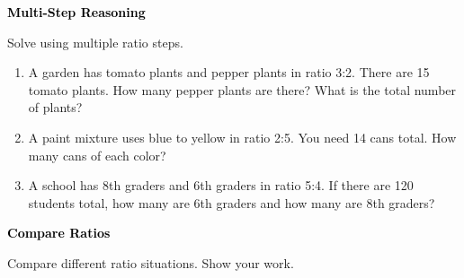 \documentclass[12pt, letterpaper, fleqn]{article}
\begin{document}
\newpage

\begin{tcolorbox}[colback=customteal!20]
\large\textcolor{black}{\textbf{Multi-Step Reasoning}}
\end{tcolorbox}

\noindent
Solve using multiple ratio steps.

\vspace{3mm}

\begin{enumerate}[itemsep=2.2cm, leftmargin=0.6cm]

\item A garden has tomato plants and pepper plants in ratio 3:2. There are 15 tomato plants. How many pepper plants are there? What is the total number of plants?

\vspace{2cm}

\item A paint mixture uses blue to yellow in ratio 2:5. You need 14 cans total. How many cans of each color?

\vspace{2cm}

\item A school has 8th graders and 6th graders in ratio 5:4. If there are 120 students total, how many are 6th graders and how many are 8th graders?

\vspace{2cm}

\end{enumerate}

\newpage

\begin{tcolorbox}[colback=customteal!20]
\large\textcolor{black}{\textbf{Compare Ratios}}
\end{tcolorbox}

\noindent
Compare different ratio situations. Show your work.

\vspace{3mm}
\end{document}
